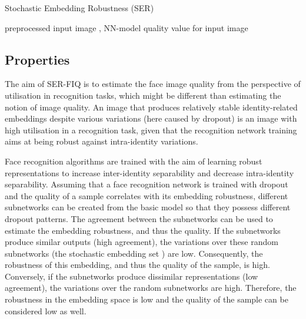 \documentclass[10pt,twocolumn,letterpaper]{article}
\begin{document}
\algnewcommand{}
\algnewcommand\INPUT{\item[\algorithmicinput]}

\algnewcommand{}
\algnewcommand\OUTPUT{\item[\algorithmicoutput]}

\begin{algorithm}[h]
\caption{Stochastic Embedding Robustness (SER)}\label{algor:SER}
\begin{algorithmic}[1]
\INPUT preprocessed input image , NN-model 
\OUTPUT quality value  for input image  
\State 
\For{}
\State 
\State 
\EndFor
\State 
\State \Return 
\EndProcedure
\end{algorithmic}
\vspace{-1mm}
\end{algorithm}





\subsection{Properties}
\label{sec:Properties}

The aim of SER-FIQ is to estimate the face image quality from the perspective of utilisation in recognition tasks, which might be different than estimating the notion of image quality.
An image that produces relatively stable identity-related embeddings despite various variations (here caused by dropout) is an image with high utilisation in a recognition task, given that the recognition network training aims at being robust against intra-identity variations.


Face recognition algorithms are trained with the aim of learning robust representations to increase inter-identity separability and decrease intra-identity separability.
Assuming that a face recognition network is trained with dropout and the quality of a sample correlates with its embedding robustness, different subnetworks can be created from the basic model so that they possess different dropout patterns. 
The agreement between the subnetworks can be used to estimate the embedding robustness, and thus the quality.
If the  subnetworks produce similar outputs (high agreement), the variations over these random subnetworks (the stochastic embedding set ) are low. 
Consequently, the robustness of this embedding, and thus the quality of the sample, is high.
Conversely, if the  subnetworks produce dissimilar representations (low agreement), the variations over the random subnetworks are high.
Therefore, the robustness in the embedding space is low and the quality of the sample can be considered low as well.
\end{document}
